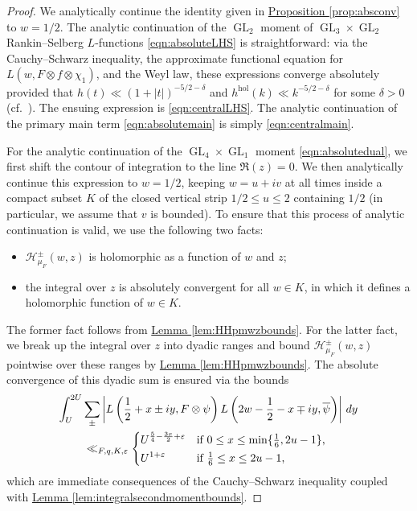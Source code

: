 \documentclass[11pt,a4paper]{amsart}
\newcommand{\e}{\varepsilon}
\newcommand{\HH}{\mathcal{H}}
\newcommand{\hol}{\mathrm{hol}}
\DeclareMathOperator{\GL}{GL}
\numberwithin{equation}{section}
\theoremstyle{remark}
\theoremstyle{definition}
\begin{document}
\begin{proof}
We analytically continue the identity given in \hyperref[prop:absconv]{Proposition \ref*{prop:absconv}} to $w = 1/2$. The analytic continuation of the $\GL_2$ moment of $\GL_3 \times \GL_2$ Rankin--Selberg $L$-functions \eqref{eqn:absoluteLHS} is straightforward: via the Cauchy--Schwarz inequality, the approximate functional equation for $L(w,F \otimes f \otimes \chi_1)$, and the Weyl law, these expressions converge absolutely provided that $h(t) \ll (1 + |t|)^{-5/2 - \delta}$ and $h^{\hol}(k) \ll k^{-5/2 - \delta}$ for some $\delta > 0$ (cf.\ \cite[Proposition 6.1 (1)]{HK25}). The ensuing expression is \eqref{eqn:centralLHS}. The analytic continuation of the primary main term \eqref{eqn:absolutemain} is simply \eqref{eqn:centralmain}.

For the analytic continuation of the $\GL_4 \times \GL_1$ moment \eqref{eqn:absolutedual}, we first shift the contour of integration to the line $\Re(z) = 0$. We then analytically continue this expression to $w = 1/2$, keeping $w = u + iv$ at all times inside a compact subset $K$ of the closed vertical strip $1/2 \leq u \leq 2$ containing $1/2$ (in particular, we assume that $v$ is bounded). To ensure that this process of analytic continuation is valid, we use the following two facts:
\begin{itemize}
\item $\HH_{\mu_F}^{\pm}(w,z)$ is holomorphic as a function of $w$ and $z$;
\item the integral over $z$ is absolutely convergent for all $w \in K$, in which it defines a holomorphic function of $w \in K$.
\end{itemize}
The former fact follows from \hyperref[lem:HHpmwzbounds]{Lemma \ref*{lem:HHpmwzbounds}}. For the latter fact, we break up the integral over $z$ into dyadic ranges and bound $\HH_{\mu_F}^{\pm}(w,z)$ pointwise over these ranges by \hyperref[lem:HHpmwzbounds]{Lemma \ref*{lem:HHpmwzbounds}}. The absolute convergence of this dyadic sum is ensured via the bounds
\begin{multline*}
\int_{U}^{2U} \sum_{\pm} \left|L\left(\frac{1}{2} + x \pm iy,F \otimes \psi\right) L\left(2w - \frac{1}{2} - x \mp iy,\overline{\psi}\right)\right| \, dy	\\
\ll_{F,q,K,\e} \begin{dcases*}
U^{\frac{5}{4} - \frac{3x}{2} + \e} & if $0 \leq x \leq \min\{\frac{1}{6},2u - 1\}$,	\\
U^{1 + \e} & if $\frac{1}{6} \leq x \leq 2u - 1$,
\end{dcases*}
\end{multline*}
which are immediate consequences of the Cauchy--Schwarz inequality coupled with \hyperref[lem:integralsecondmomentbounds]{Lemma \ref*{lem:integralsecondmomentbounds}}. 


\end{proof}
\end{document}

